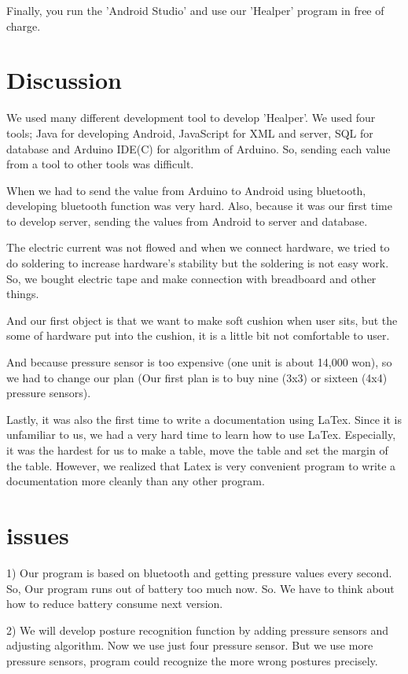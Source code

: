 \documentclass[conference]{IEEEtran}
\begin{document}
Finally, you run the 'Android Studio' and use our 'Healper' program in free of charge.\\

\section{Discussion}


We used many different development tool to develop 'Healper'. We used four tools; Java for developing Android, JavaScript for XML and server, SQL for database and Arduino IDE(C) for algorithm of Arduino. So, sending each value from a tool to other tools was difficult.

When we had to send the value from Arduino to Android using bluetooth, developing bluetooth function was very hard. Also, because it was our first time to develop server, sending the values from Android to server and database.

The electric current was not flowed and when we connect hardware, we tried to do soldering to increase hardware's stability but the soldering is not easy work. So, we bought electric tape and make connection with breadboard and other things. 

And our first object is that we want to make soft cushion when user sits, but the some of hardware put into the cushion, it is a little bit not comfortable to user. 

And because pressure sensor is too expensive (one unit is about 14,000 won), so we had to change our plan (Our first plan is to buy nine (3x3) or sixteen (4x4) pressure sensors).  
 
Lastly, it was also the first time to write a documentation using LaTex. Since it is unfamiliar to us, we had a very hard time to learn how to use LaTex. Especially, it was the hardest for us to make a table, move the table and set the margin of the table. However, we realized that Latex is very convenient program to write a documentation more cleanly than any other program.
 

\section* {issues}


1) Our program is based on bluetooth and getting pressure values every second. So, Our program runs out of battery too much now. So. We have to think about how to reduce battery consume next version.

2) We will develop posture recognition function by adding pressure sensors and adjusting algorithm. Now we use just four pressure sensor. But we use more pressure sensors, program could recognize the more wrong postures precisely.
\end{document}
